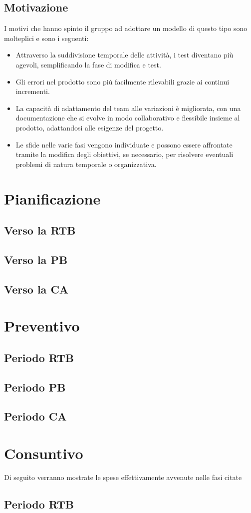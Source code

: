 \documentclass[5pt]{article}
\begin{document}
\subsection{Motivazione}
I motivi che hanno spinto il gruppo ad adottare un modello di questo tipo sono molteplici e sono i seguenti:
\begin{itemize}
    \item Attraverso la suddivisione temporale delle attività, i test diventano più agevoli, semplificando la fase di modifica e test.
    \item Gli errori nel prodotto sono più facilmente rilevabili grazie ai continui incrementi.
    \item La capacità di adattamento del team alle variazioni è migliorata, con una documentazione che si evolve in modo collaborativo e flessibile insieme al prodotto, adattandosi alle esigenze del progetto.
    \item Le sfide nelle varie fasi vengono individuate e possono essere affrontate tramite la modifica degli obiettivi, se necessario, per risolvere eventuali problemi di natura temporale o organizzativa.
\end{itemize}

\section{Pianificazione}
\subsection{Verso la RTB}
\subsection{Verso la PB}
\subsection{Verso la CA}

\section{Preventivo}
\subsection{Periodo RTB}
\subsection{Periodo PB}
\subsection{Periodo CA}

\section{Consuntivo}
Di seguito verranno mostrate le spese effettivamente avvenute nelle fasi citate
\subsection{Periodo RTB}
\end{document}
